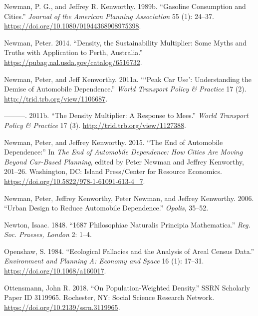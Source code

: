 \documentclass[
  11pt,
  openany]{memoir}
\newlength{\cslhangindent}
\newlength{\cslentryspacingunit} %
\newenvironment{CSLReferences}[2] %
 {%
  \setlength{\parindent}{0pt}
  \ifodd #1
  \let\oldpar\par
  \def\par{\hangindent=\cslhangindent\oldpar}
  \fi
  \setlength{\parskip}{#2\cslentryspacingunit}
 }%
 {}
\begin{document}
\begin{CSLReferences}{1}{0}
\leavevmode{}%
Newman, P. G., and Jeffrey R. Kenworthy. 1989b. {``Gasoline {Consumption} and {Cities}.''} \emph{Journal of the American Planning Association} 55 (1): 24--37. \url{https://doi.org/10.1080/01944368908975398}.

\leavevmode{}%
Newman, Peter. 2014. {``Density, the {Sustainability Multiplier}: Some {Myths} and {Truths} with {Application} to {Perth}, {Australia}.''} \url{https://pubag.nal.usda.gov/catalog/6516732}.

\leavevmode{}%
Newman, Peter, and Jeff Kenworthy. 2011a. {``{`{Peak Car Use}'}: Understanding the {Demise} of {Automobile Dependence}.''} \emph{World Transport Policy \& Practice} 17 (2). \url{http://trid.trb.org/view/1106687}.

\leavevmode{}%
---------. 2011b. {``The {Density Multiplier}: A {Response} to {Mees}.''} \emph{World Transport Policy \& Practice} 17 (3). \url{http://trid.trb.org/view/1127388}.

\leavevmode{}%
Newman, Peter, and Jeffrey Kenworthy. 2015. {``The {End} of {Automobile Dependence}:''} In \emph{The {End} of {Automobile Dependence}: How {Cities Are Moving Beyond Car}-{Based Planning}}, edited by Peter Newman and Jeffrey Kenworthy, 201--26. {Washington, DC}: {Island Press/Center for Resource Economics}. \url{https://doi.org/10.5822/978-1-61091-613-4_7}.

\leavevmode{}%
Newman, Peter, Jeffrey Kenworthy, Peter Newman, and Jeffrey Kenworthy. 2006. {``Urban Design to Reduce Automobile Dependence.''} \emph{Opolis}, 35--52.

\leavevmode{}%
Newton, Isaac. 1848. {``1687 Philosophiae Naturalis Principia Mathematica.''} \emph{Reg. Soc. Praeses, London} 2: 1--4.

\leavevmode{}%
Openshaw, S. 1984. {``Ecological {Fallacies} and the {Analysis} of {Areal Census Data}.''} \emph{Environment and Planning A: Economy and Space} 16 (1): 17--31. \url{https://doi.org/10.1068/a160017}.

\leavevmode{}%
Ottensmann, John R. 2018. {``On {Population}-{Weighted Density}.''} SSRN Scholarly Paper ID 3119965. {Rochester, NY}: {Social Science Research Network}. \url{https://doi.org/10.2139/ssrn.3119965}.


\end{CSLReferences}
\end{document}
